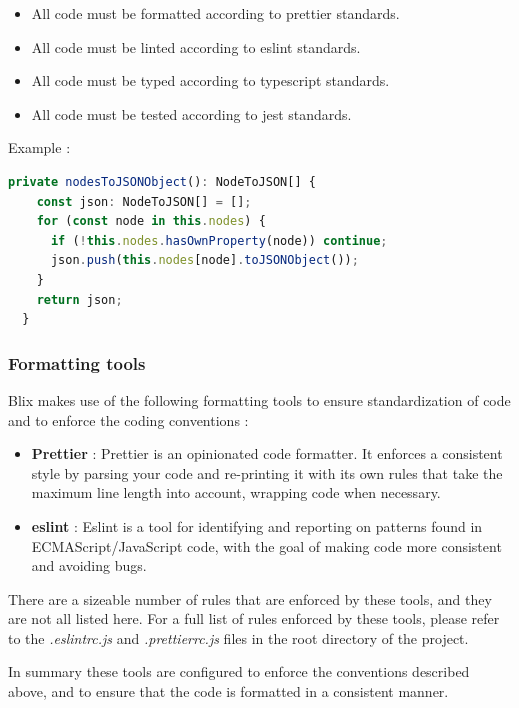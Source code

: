 \documentclass[11pt,a4paper]{article}
\begin{document}
\begin{itemize}
    \item[\textbullet] All code must be formatted according to prettier standards.
    \item[\textbullet] All code must be linted according to eslint standards.
    \item[\textbullet] All code must be typed according to typescript standards.
    \item[\textbullet] All code must be tested according to jest standards.
\end{itemize}

Example :

\begin{lstlisting}[language=TypeScript]
private nodesToJSONObject(): NodeToJSON[] {
    const json: NodeToJSON[] = [];
    for (const node in this.nodes) {
      if (!this.nodes.hasOwnProperty(node)) continue;
      json.push(this.nodes[node].toJSONObject());
    }
    return json;
  }
\end{lstlisting}

\subsubsection*{Formatting tools}

Blix makes use of the following formatting tools to ensure standardization of code and to enforce the coding conventions : 
\begin{itemize}
    \item[\textbullet] \textbf{Prettier} : Prettier is an opinionated code formatter. It enforces a consistent style by parsing
    your code and re-printing it with its own rules that take the maximum line length into account, wrapping code when necessary.
    \item[\textbullet] \textbf{eslint} : Eslint is a tool for identifying and reporting on patterns found in ECMAScript/JavaScript code, 
    with the goal of making code more consistent and avoiding bugs.
\end{itemize}

There are a sizeable number of rules that are enforced by these tools, and they are not all listed here. 
For a full list of rules enforced by these tools, please refer to the \textit{.eslintrc.js} and \textit{.prettierrc.js} files in the 
root directory of the project.

In summary these tools are configured to enforce the conventions described above, and to ensure that the code is formatted in a consistent manner.

\pagebreak
\end{document}
